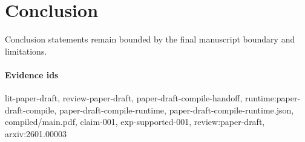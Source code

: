 \section{Conclusion}
Conclusion statements remain bounded by the final manuscript boundary and limitations.

\paragraph{Evidence ids} lit-paper-draft, review-paper-draft, paper-draft-compile-handoff, runtime:paper-draft-compile, paper-draft-compile-runtime, paper-draft-compile-runtime.json, compiled/main.pdf, claim-001, exp-supported-001, review:paper-draft, arxiv:2601.00003
